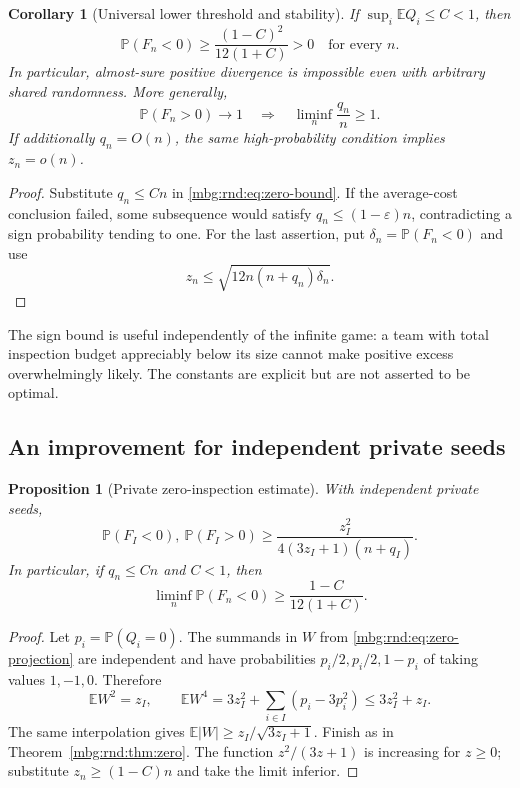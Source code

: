 \documentclass[11pt,letterpaper]{article}
\newtheorem{proposition}[theorem]{Proposition}
\newtheorem{corollary}[theorem]{Corollary}
\theoremstyle{definition}
\newcommand{\E}{\mathbb E}
\newcommand{\Prb}{\mathbb P}
\begin{document}
\begin{corollary}[Universal lower threshold and stability]
\label{mbg:rnd:cor:costone}
If $\sup_i\E Q_i\le C<1$, then
\begin{equation}
 \Prb(F_n<0)\ge\frac{(1-C)^2}{12(1+C)}>0
 \quad\text{for every }n.
 \label{mbg:rnd:eq:uniform-negative}
\end{equation}
In particular, almost-sure positive divergence is impossible even with
arbitrary shared randomness. More generally,
\begin{equation}
 \Prb(F_n>0)\longrightarrow1
 \quad\Longrightarrow\quad
 \liminf_n\frac{q_n}{n}\ge1.
 \label{mbg:rnd:eq:average-necessary}
\end{equation}
If additionally $q_n=O(n)$, the same high-probability condition implies
$z_n=o(n)$.
\end{corollary}
\begin{proof}
Substitute $q_n\le Cn$ in \eqref{mbg:rnd:eq:zero-bound}. If the average-cost
conclusion failed, some subsequence would satisfy
$q_n\le(1-\varepsilon)n$, contradicting a sign probability tending to
one. For the last assertion, put $\delta_n=\Prb(F_n<0)$ and use
\begin{equation}
 z_n\le\sqrt{12n(n+q_n)\delta_n}.
 \label{mbg:rnd:eq:stability}
\end{equation}
\end{proof}

The sign bound is useful independently of the infinite game: a team
with total inspection budget appreciably below its size cannot make
positive excess overwhelmingly likely. The constants are explicit but
are not asserted to be optimal.

\subsection{An improvement for independent private seeds}

\begin{proposition}[Private zero-inspection estimate]
\label{mbg:rnd:prop:private-zero}
With independent private seeds,
\begin{equation}
 \Prb(F_I<0),\ \Prb(F_I>0)
 \ge\frac{z_I^2}{4(3z_I+1)(n+q_I)}.
 \label{mbg:rnd:eq:private-zero}
\end{equation}
In particular, if $q_n\le Cn$ and $C<1$, then
\[
 \liminf_n\Prb(F_n<0)\ge\frac{1-C}{12(1+C)}.
\]
\end{proposition}
\begin{proof}
Let $p_i=\Prb(Q_i=0)$. The summands in $W$ from
\eqref{mbg:rnd:eq:zero-projection} are independent and have probabilities
$p_i/2,p_i/2,1-p_i$ of taking values $1,-1,0$. Therefore
\[
 \E W^2=z_I,\qquad
 \E W^4=3z_I^2+\sum_{i\in I}(p_i-3p_i^2)
 \le3z_I^2+z_I.
\]
The same interpolation gives $\E|W|\ge z_I/\sqrt{3z_I+1}$.
Finish as in Theorem~\ref{mbg:rnd:thm:zero}. The function $z^2/(3z+1)$ is increasing
for $z\ge0$; substitute $z_n\ge(1-C)n$ and take the limit inferior.
\end{proof}
\end{document}
